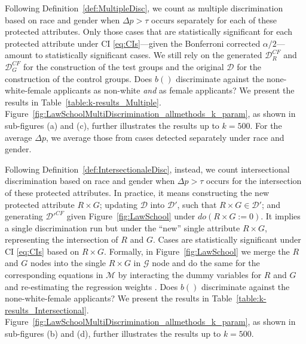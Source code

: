 Following Definition~\ref{def:MultipleDisc}, we count as multiple discrimination based on race and gender when $\Delta p > \tau$ occurs separately for each of these protected attributes. 
Only those cases that are statistically significant for each protected attribute under CI \eqref{eq:CIs}---given the Bonferroni corrected $\alpha/2$---amount to statistically significant cases. 
We still rely on the generated $\mathcal{D}_R^{CF}$ and $\mathcal{D}_G^{CF}$ for the construction of the test groups and the original $\mathcal{D}$ for the construction of the control groups.
%
Does $b()$ discriminate against the none-white-female applicants as non-white \textit{and} as female applicants?
We present the results in Table~\ref{table:k-results_Multiple}. 
Figure~\ref{fig:LawSchoolMultiDiscrimination_allmethods_k_param}, as shown in sub-figures (a) and (c), further illustrates the results up to $k=500$. 
For the average $\Delta p$, we average those from cases detected separately under race and gender.

Following Definition~\ref{def:IntersectionaleDisc}, instead, we count intersectional discrimination based on race and gender when $\Delta p > \tau$ occurs for the intersection of these protected attributes. 
In practice, it means constructing the new protected attribute $R \times G$; updating $\mathcal{D}$ into $\mathcal{D}'$, such that $R \times G \in \mathcal{D}'$; and generating $\mathcal{D}'^{CF}$ given Figure~\ref{fig:LawSchool} under $do(R \times G := 0)$.
It implies a single discrimination run but under the ``new'' single attribute $R \times G$, representing the intersection of $R$ and $G$. 
Cases are statistically significant under CI \eqref{eq:CIs} based on $R \times G$.
Formally, in Figure~\ref{fig:LawSchool} we merge the $R$ and $G$ nodes into the single $R \times G$ in $\mathcal{G}$ node and do the same for the corresponding equations in $\mathcal{M}$ by interacting the dummy variables for $R$ and $G$ and re-estimating the regression weights \parencite{Wooldridge2015IntroductoryEconometrics}.
%
Does $b()$ discriminate against the none-white-female applicants?
We present the results in Table~\ref{table:k-results_Intersectional}.
Figure~\ref{fig:LawSchoolMultiDiscrimination_allmethods_k_param}, as shown in sub-figures (b) and (d), further illustrates the results up to $k=500$.

